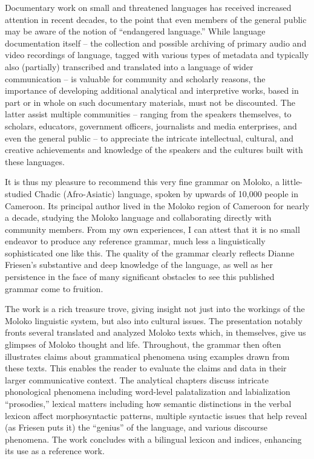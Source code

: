 
Documentary work on small and threatened languages has received increased attention in recent decades, to the point that even members of the general public may be aware of the notion of “endangered language.” While language documentation itself --  the collection and possible archiving of primary audio and video recordings of language, tagged with various types of metadata and typically also (partially) transcribed and translated into a language of wider communication -- is valuable for community and scholarly reasons, the importance of developing additional analytical and interpretive works, based in part or in whole on such documentary materials, must not be discounted. The latter assist multiple communities -- ranging from the speakers themselves, to scholars, educators, government officers, journalists and media enterprises, and even the general public -- to appreciate the intricate intellectual, cultural, and creative achievements and knowledge of the speakers and the cultures built with these languages.

It is thus my pleasure to recommend this very fine grammar on Moloko, a little-studied Chadic (Afro-Asiatic) language, spoken by upwards of 10,000 people in Cameroon. Its principal author lived in the Moloko region of Cameroon for nearly a decade, studying the Moloko language and collaborating directly with community members. From my own experiences, I can attest that it is no small endeavor to produce any reference grammar, much less a linguistically sophisticated one like this. The quality of the grammar clearly reflects Dianne Friesen’s substantive and deep knowledge of the language, as well as her persistence in the face of many significant obstacles to see this published grammar come to fruition.

The work is a rich treasure trove, giving insight not just into the workings of the Moloko linguistic system, but also into cultural issues. The presentation notably fronts several translated and analyzed Moloko texts which, in themselves, give us glimpses of Moloko thought and life. Throughout, the grammar then often illustrates claims about grammatical phenomena using examples drawn from these texts. This enables the reader to evaluate the claims and data in their larger communicative context. The analytical chapters discuss intricate phonological phenomena including word-level palatalization and labialization “prosodies,” \nohyphens{lexical} matters including how semantic distinctions in the verbal lexicon affect morphosyntactic patterns, multiple syntactic issues that help reveal (as Friesen puts it) the “genius” of the language, and various discourse phenomena. The work concludes with a bilingual lexicon and indices, enhancing its use as a reference work. 

